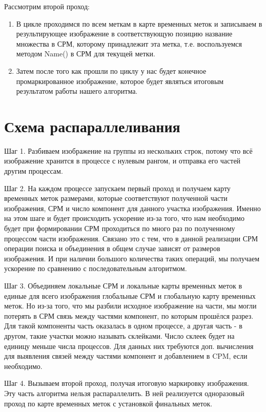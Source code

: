 \documentclass{report}
\begin{document}
			\item Рассмотрим второй проход:
			\begin{enumerate}
				\item В цикле проходимся по всем меткам в карте временных меток и записываем в результирующее изображение в соответствующую позицию название множества в СРМ, которому принадлежит эта метка, т.е. воспользуемся методом Name() в СРМ для текущей метки.
				\item Затем после того как прошли по циклу у нас будет конечное промаркированное изображение, которое будет являться итоговым результатом работы нашего алгоритма.
            \end{enumerate}
		
	\newpage
\section*{Схема распараллеливания}
\par Шаг 1. Разбиваем изображение на группы из нескольких строк, потому что всё изображение хранится в процессе с нулевым рангом,
и отправка его частей другим процессам.
\par Шаг 2. На каждом процессе запускаем первый проход и получаем карту временных меток размерами, которые соответствуют полученной части изображения, СРМ и число компонент для данного участка изображения. Именно на этом шаге и будет происходить ускорение из-за того, что
нам необходимо будет при формировании СРМ проходиться по много раз по
полученному процессом части изображения. Связано это с тем, что в данной
реализации СРМ операции поиска и объединения в общем случае зависят от
размеров изображения. И при наличии большого количества таких операций,
мы получаем ускорение по сравнению с последовательным алгоритмом.
\par Шаг 3. Объединяем локальные СРМ и локальные карты временных меток в единые для всего изображения глобальные СРМ и глобальную карту временных меток. Но из-за того, что мы разбили исходное изображение на части, мы могли потерять в СРМ связь между частями компонент, по которым прошёлся разрез. Для такой компоненты часть оказалась в одном процессе, а другая часть - в другом, такие участки можно называть склейками. Число склеек будет на единицу меньше числа процессов. Для данных них требуются доп. вычисления для выявления связей между частями компонент и добавлением в CPM, если необходимо.
\par Шаг 4. Вызываем второй проход, получая
итоговую маркировку изображения. Эту часть алгоритма
нельзя распараллелить. В ней реализуется одноразовый проход по карте временных меток с установкой финальных меток.
\newpage
\end{document}
